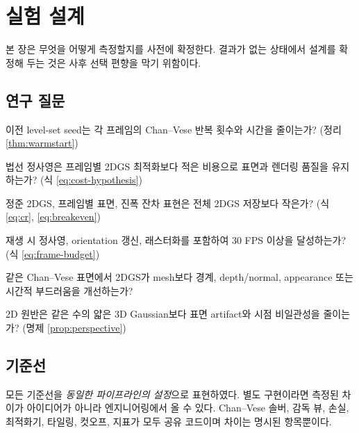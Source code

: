\chapter{실험 설계}
\label{ch:protocol}

본 장은 무엇을 어떻게 측정할지를 사전에 확정한다. 결과가 없는 상태에서 설계를
확정해 두는 것은 사후 선택 편향을 막기 위함이다.

\section{연구 질문}
\label{sec:rqs}

\begin{description}[leftmargin=1.6cm,style=nextline]
  \item[RQ1] 이전 level-set seed는 각 프레임의 Chan--Vese 반복 횟수와 시간을
  줄이는가? (정리 \ref{thm:warmstart})
  \item[RQ2] 법선 정사영은 프레임별 2DGS 최적화보다 적은 비용으로 표면과 렌더링
  품질을 유지하는가? (식 \eqref{eq:cost-hypothesis})
  \item[RQ3] 정준 2DGS, 프레임별 표면, 진폭 잔차 표현은 전체 2DGS 저장보다 작은가?
  (식 \eqref{eq:cr}, \eqref{eq:breakeven})
  \item[RQ4] 재생 시 정사영, orientation 갱신, 래스터화를 포함하여 30 FPS 이상을
  달성하는가? (식 \eqref{eq:frame-budget})
  \item[RQ5] 같은 Chan--Vese 표면에서 2DGS가 mesh보다 경계, depth/normal, appearance
  또는 시간적 부드러움을 개선하는가?
  \item[RQ6] 2D 원반은 같은 수의 얇은 3D Gaussian보다 표면 artifact와 시점 비일관성을
  줄이는가? (명제 \ref{prop:perspective})
\end{description}

\section{기준선}
\label{sec:baselines}

모든 기준선을 \emph{동일한 파이프라인의 설정}으로 표현하였다. 별도 구현이라면 측정된
차이가 아이디어가 아니라 엔지니어링에서 올 수 있다. Chan--Vese 솔버, 감독 뷰, 손실,
최적화기, 타일링, 컷오프, 지표가 모두 공유 코드이며 차이는 명시된 항목뿐이다.

